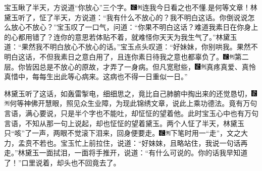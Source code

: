 宝玉瞅了半天，方说道``你放心''三个字。{\includegraphics[width=3mm]{../Images/00006}\includegraphics[width=3mm]{../Images/00011}\footnotesize \kaishu 连我今日看之也不懂.是何等文章！}林黛玉听了，怔了半天，方说道：``我有什么不放心的？我不明白这话。你倒说说怎么放心不放心？''宝玉叹了一口气，问道：``你果不明白这话？难道我素日在你身上的心都用错了？连你的意思若体贴不着，就难怪你天天为我生气了。''林黛玉道：``果然我不明白放心不放心的话。''宝玉点头叹道：``好妹妹，你别哄我。果然不明白这话，不但我素日之意白用了，且连你素日待我之意也都辜负了。{\includegraphics[width=3mm]{../Images/00006}\includegraphics[width=3mm]{../Images/00011}\footnotesize \kaishu 第二层。}你皆因总是不放心的原故，才弄了一身病。但凡宽慰些，{\includegraphics[width=3mm]{../Images/00006}\includegraphics[width=3mm]{../Images/00011}\footnotesize \kaishu 真疼真爱、真怜真惜中，每每生出此等心病来。}这病也不得一日重似一日。''

林黛玉听了这话，如轰雷掣电，细细思之，竟比自己肺腑中掏出来的还觉恳切，{\includegraphics[width=3mm]{../Images/00006}\includegraphics[width=3mm]{../Images/00011}\footnotesize \kaishu 何等神佛开慧眼，照见众生业障，为现此锦绣文章，说此上乘功德法。}竟有万句言语，满心要说，只是半个字也不能吐，却怔怔的望着他。此时宝玉心中也有万句言语，不知从那一句上说起，却也怔怔的望着黛玉。两个人怔了半天，林黛玉只``咳''了一声，两眼不觉滚下泪来，回身便要走。{\includegraphics[width=3mm]{../Images/00006}\includegraphics[width=3mm]{../Images/00011}\footnotesize \kaishu 下笔时用一``走''，文之大力，孟贲不若也。}宝玉忙上前拉住，说道：``好妹妹，且略站住，我说一句话再走。''林黛玉一面拭泪，一面将手推开，说道：``有什么可说的。你的话我早知道了！''口里说着，却头也不回竟去了。

